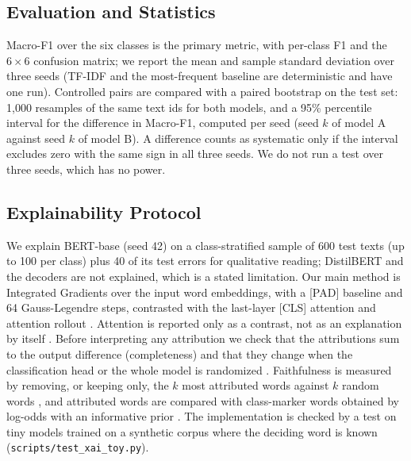 \begin{table}[t]
\centering
\caption{Hyperparameter search results (selection-set Macro-F1, one seed). Decoders were tuned on 20\% of $S$ for one epoch; the other families on the full $S$ (BiLSTM on 20\% of $S$).}
\label{tab:hpo}
\small

\end{table}

\subsection{Evaluation and Statistics}
Macro-F1 over the six classes is the primary metric, with per-class F1 and the $6\times6$ confusion matrix; we report the mean and sample standard deviation over three seeds (TF-IDF and the most-frequent baseline are deterministic and have one run). Controlled pairs are compared with a paired bootstrap on the test set: 1,000 resamples of the same text ids for both models, and a 95\% percentile interval for the difference in Macro-F1, computed per seed (seed $k$ of model A against seed $k$ of model B). A difference counts as systematic only if the interval excludes zero with the same sign in all three seeds. We do not run a test over three seeds, which has no power.

\subsection{Explainability Protocol}
We explain BERT-base (seed 42) on a class-stratified sample of 600 test texts (up to 100 per class) plus 40 of its test errors for qualitative reading; DistilBERT and the decoders are not explained, which is a stated limitation. Our main method is Integrated Gradients \cite{sundararajan2017axiomatic} over the input word embeddings, with a [PAD] baseline and 64 Gauss-Legendre steps, contrasted with the last-layer [CLS] attention and attention rollout \cite{abnar2020quantifying}. Attention is reported only as a contrast, not as an explanation by itself \cite{jain2019attention,wiegreffe2019attention}. Before interpreting any attribution we check that the attributions sum to the output difference (completeness) and that they change when the classification head or the whole model is randomized \cite{adebayo2018sanity}. Faithfulness is measured by removing, or keeping only, the $k$ most attributed words against $k$ random words \cite{deyoung2020eraser}, and attributed words are compared with class-marker words obtained by log-odds with an informative prior \cite{monroe2008fightin}. The implementation is checked by a test on tiny models trained on a synthetic corpus where the deciding word is known (\texttt{scripts/test\_xai\_toy.py}).

